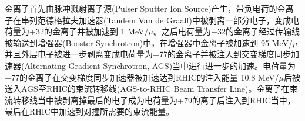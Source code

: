 金离子首先由脉冲溅射离子源(Pulser Sputter Ion Source)产生，带负电荷的金离子在串列范德格拉夫加速器(Tandem Van de Graaff)中被剥离一部分电子，变成电荷量为+32的金离子并被加速到 1 MeV/$\mu$。之后电荷量为+32的金离子经过传输线被输送到增强器(Booster Synchrotron)中，在增强器中金离子被加速到 95 MeV/$\mu$ 并且外层电子被进一步剥离变成电荷量为+77的金离子并被注入到交变梯度同步加速器(Alternating Gradient Synchrotron, AGS)当中进行进一步的加速。电荷量为+77的金离子在交变梯度同步加速器被加速达到RHIC的注入能量 10.8 MeV/$\mu$后被送入AGS至RHIC的束流转移线(AGS-to-RHIC Beam Transfer Line)。金离子在束流转移线当中被剥离掉最后的电子成为电荷量为+79的离子后注入到RHIC当中，最后在RHIC中加速到对撞所需要的束流能量。